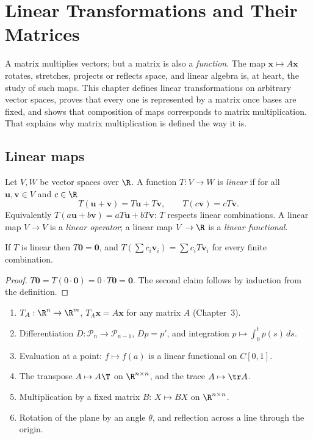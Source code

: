 \chapter{Linear Transformations and Their Matrices}

A matrix multiplies vectors; but a matrix is also a \emph{function}. The map $\mathbf{x}\mapsto A\mathbf{x}$ rotates, stretches, projects or reflects space, and linear algebra is, at heart, the study of such maps. This chapter defines linear transformations on arbitrary vector spaces, proves that every one is represented by a matrix once bases are fixed, and shows that composition of maps corresponds to matrix multiplication. That explains why matrix multiplication is defined the way it is.

\section{Linear maps}

\begin{definition}
Let $V,W$ be vector spaces over $\R$. A function $T:V\to W$ is \emph{linear} if for all $\mathbf{u},\mathbf{v}\in V$ and $c\in\R$
\[ T(\mathbf{u}+\mathbf{v})=T\mathbf{u}+T\mathbf{v},\qquad T(c\mathbf{v})=cT\mathbf{v}. \]
Equivalently $T(a\mathbf{u}+b\mathbf{v})=aT\mathbf{u}+bT\mathbf{v}$: $T$ respects linear combinations. A linear map $V\to V$ is a \emph{linear operator}; a linear map $V\to\R$ is a \emph{linear functional}.
\end{definition}

\begin{proposition}\label{prop:lin0}
If $T$ is linear then $T\mathbf{0}=\mathbf{0}$, and $T(\sum c_i\mathbf{v}_i)=\sum c_iT\mathbf{v}_i$ for every finite combination.
\end{proposition}

\begin{proof}
$T\mathbf{0}=T(0\cdot\mathbf{0})=0\cdot T\mathbf{0}=\mathbf{0}$. The second claim follows by induction from the definition.
\end{proof}

\begin{example}\label{ex:linmaps}
\begin{enumerate}[label=(\alph*)]
  \item $T_A:\R^n\to\R^m$, $T_A\mathbf{x}=A\mathbf{x}$ for any matrix $A$ (Chapter~3).
  \item Differentiation $D:\mathcal{P}_n\to\mathcal{P}_{n-1}$, $Dp=p'$, and integration $p\mapsto\int_0^tp(s)\,ds$.
  \item Evaluation at a point: $f\mapsto f(a)$ is a linear functional on $C[0,1]$.
  \item The transpose $A\mapsto A\T$ on $\R^{n\times n}$, and the trace $A\mapsto\tr A$.
  \item Multiplication by a fixed matrix $B$: $X\mapsto BX$ on $\R^{n\times n}$.
  \item Rotation of the plane by an angle $\theta$, and reflection across a line through the origin.
\end{enumerate}
\end{example}


